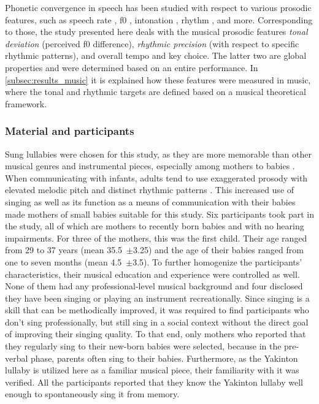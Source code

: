 Phonetic convergence in speech has been studied with respect to various prosodic features, such as speech rate \citep{Schweitzer2013convergence, Pardo2012phonetic}, \acl{f0} \citep{Babel2012role, Collins1998convergence}, intonation \citep{DImperio2014phonetic, Simonet2011intonational}, rhythm \citep{Krivokapic2013rhythm}, and more.
Corresponding to those, the study presented here deals with the musical prosodic features \emph{tonal deviation} (perceived \acf{f0} difference), \emph{rhythmic precision} (with respect to specific rhythmic patterns), and overall tempo and key choice.
The latter two are global properties and were determined based on an entire performance.
In \cref{subsec:results_music} it is explained how these features were measured in music, where the tonal and rhythmic targets are defined based on a musical theoretical framework.

\subsubsection{Material and participants}
\label{subsubsec:material_participants_music}

Sung lullabies were chosen for this study, as they are more memorable than other musical genres and instrumental pieces, especially among mothers to babies \citep{Weiss2012something, Trehub1991music}.
When communicating with infants, adults tend to use exaggerated prosody with elevated melodic pitch and distinct rhythmic patterns \citep{Fernald1991prosody}.
This increased use of singing as well as its function as a means of communication with their babies \citep[see][]{Street2003mothers,Papouvsek1991meanings} made mothers of small babies suitable for this study.
Six participants took part in the study, all of which are mothers to recently born babies and with no hearing impairments.
For three of the mothers, this was the first child.
Their age ranged from 29 to 37 years (mean 35.5~$\pm$3.25) and the age of their babies ranged from one to seven months (mean 4.5~$\pm$3.5).
To further homogenize the participants' characteristics, their musical education and experience were controlled as well.
None of them had any professional-level musical background and four disclosed they have been singing or playing an instrument recreationally.
Since singing is a skill that can be methodically improved, it was required to find participants who don't sing professionally, but still sing in a social context without the direct goal of improving their singing quality.
To that end, only mothers who reported that they regularly sing to their new-born babies were selected, because in the pre-verbal phase, parents often sing to their babies.
Furthermore, as the Yakinton lullaby is utilized here as a familiar musical piece, their familiarity with it was verified.
All the participants reported that they know the Yakinton lullaby well enough to spontaneously sing it from memory.

